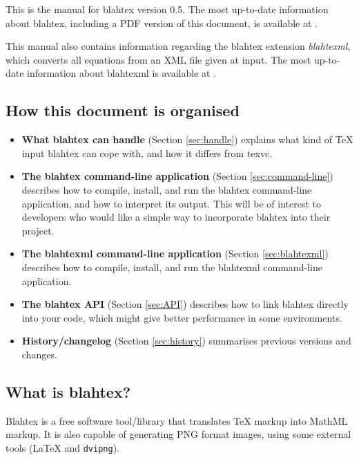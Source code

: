 \documentclass{article}
\newcommand{\blahtexversion}{0.5}
\begin{document}
\begin{htmlonly}
This is the manual for blahtex version \blahtexversion. The most up-to-date information about blahtex, including
a PDF version of this document, is available at .

This manual also contains information regarding the blahtex extension \emph{blahtexml}, which converts
all equations from an XML file given at input.
The most up-to-date information about blahtexml is available at
.
\end{htmlonly}

\subsection{How this document is organised}

\begin{itemize}
\item {\bf What blahtex can handle} (Section \ref{sec:handle}) explains what kind of \TeX{} input blahtex can cope with, and how it differs from texvc.
\item {\bf The blahtex command-line application} (Section \ref{sec:command-line}) describes how to compile, install, and run the blahtex command-line application, and how to interpret its output. This will be of interest to developers who would like a simple way to incorporate blahtex into their project.
\item {\bf The blahtexml command-line application} (Section \ref{sec:blahtexml}) describes how to compile, install, and run the blahtexml command-line application.
\item {\bf The blahtex API} (Section \ref{sec:API}) describes how to link blahtex directly into your code, which might give better performance in some environments.
\item {\bf History/changelog} (Section \ref{sec:history}) summarises previous versions and changes.
\end{itemize}

\subsection{What is blahtex?}

Blahtex is a free software tool/library that translates \TeX{} markup into MathML markup. It is also capable of generating PNG format images, using some external tools (\LaTeX{} and \texttt{dvipng}).
\end{document}
